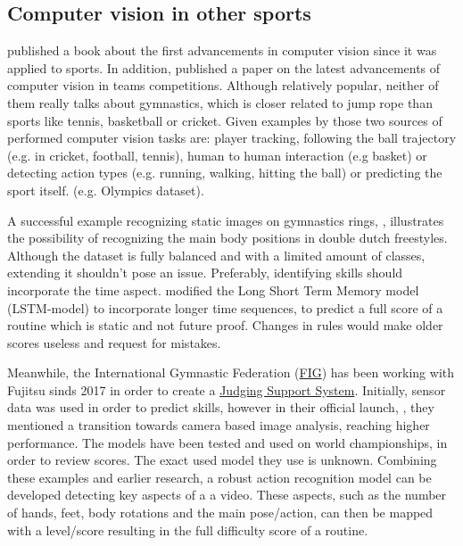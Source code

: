 \subsection{Computer vision in other sports}
\label{lit:computer-vision-sports}

\textcite{Soomro_2014} published a book about the first advancements in computer vision since it was applied to sports. In addition, \textcite{Yin_2024} published a paper on the latest advancements of computer vision in teams competitions. Although relatively popular, neither of them really talks about gymnastics, which is closer related to jump rope than sports like tennis, basketball or cricket.
Given examples by those two sources of performed computer vision tasks are: player tracking, following the ball trajectory (e.g. in cricket, football, tennis), human to human interaction (e.g basket) or detecting action types (e.g. running, walking, hitting the ball) or predicting the sport itself. (e.g. Olympics dataset).

A successful example recognizing static images on gymnastics rings, \textcite{Abdullah_2023}, illustrates the possibility of recognizing the main body positions in double dutch freestyles. Although the dataset is fully balanced and with a limited amount of classes, extending it shouldn't pose an issue. Preferably, identifying skills should incorporate the time aspect.
\textcite{Zahan_2023} modified the Long Short Term Memory model (LSTM-model) to incorporate longer time sequences, to predict a full score of a routine which is static and not future proof. Changes in rules would make older scores useless and request for mistakes.

Meanwhile, the International Gymnastic Federation (\href{https://www.gymnastics.sport/site/}{FIG}) has been working with Fujitsu sinds 2017 in order to create a \href{https://www.fujitsu.com/global/themes/data-driven/judging-support-system/}{Judging Support System}. Initially, sensor data was used in order to predict skills, however in their official launch, \autocite{Fujitsu2023launch}, they mentioned a transition towards camera based image analysis, reaching higher performance. The models have been tested and used on world championships, in order to review scores. The exact used model they use is unknown.
Combining these examples and earlier research, a robust action recognition model can be developed detecting key aspects of a a video. These aspects, such as the number of hands, feet, body rotations and the main pose/action, can then be mapped with a level/score resulting in the full difficulty score of a routine.

